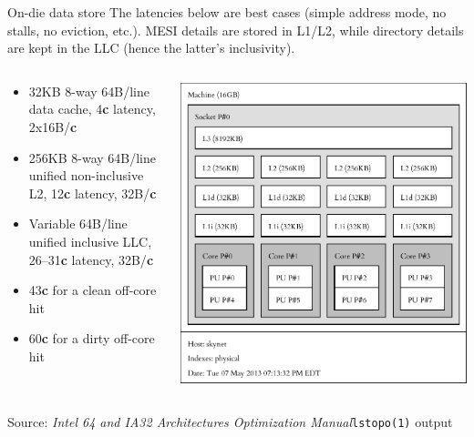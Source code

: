 \documentclass[mathserif,xcolor={dvipsnames,table}]{beamer}
\begin{document}
\begin{frame}{On-die data store}
The latencies below are best cases (simple address mode, no stalls, no eviction, etc.). MESI details are stored
in L1/L2, while directory details are kept in the LLC (hence the latter's
inclusivity).
\vfill
\begin{columns}
\begin{column}{0.5\textwidth}
\begin{itemize}
\item 32KB 8-way 64B/line data cache, 4\textbf{c} latency, 2x16B/\textbf{c}
\item 256KB 8-way 64B/line unified non-inclusive L2, 12\textbf{c} latency, 32B/\textbf{c}
\item Variable 64B/line unified inclusive LLC, 26--31\textbf{c} latency, 32B/\textbf{c}
\item 43\textbf{c} for a clean off-core hit
\item 60\textbf{c} for a dirty off-core hit
\end{itemize}
\end{column}
\begin{column}{0.5\textwidth}
\includegraphics[scale=.4]{images/skynet.pdf}
\end{column}
\end{columns}
\vfill\tiny{Source: \textit{Intel 64 and IA32 Architectures Optimization Manual}\hfill\texttt{lstopo(1)} output}
\end{frame}
\end{document}
